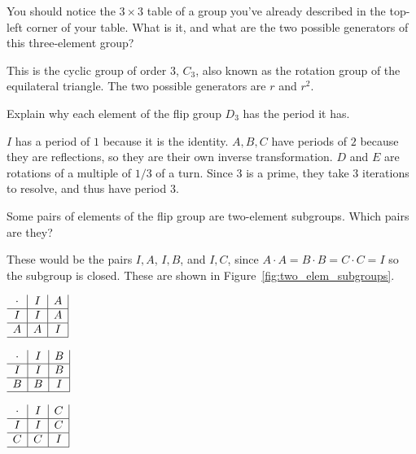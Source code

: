 \documentclass[../gatm_answers.tex]{subfiles}
\begin{document}
\begin{outer_problem}
\item You should notice the $3\times 3$ table of a group you've already described in the top-left corner of your table. What is it, and what are the two possible generators of this three-element group?
\end{outer_problem}

This is the cyclic group of order $3$, $C_3$, also known as the rotation group of the equilateral triangle. The two possible generators are $r$ and $r^2$.

\begin{outer_problem}
\item Explain why each element of the flip group $D_3$ has the period it has.
\end{outer_problem}

$I$ has a period of $1$ because it is the identity. $A,B,C$ have periods of $2$ because they are reflections, so they are their own inverse transformation. $D$ and $E$ are rotations of a multiple of $1/3$ of a turn. Since $3$ is a prime, they take $3$ iterations to resolve, and thus have period $3$.

\begin{outer_problem}
\item Some pairs of elements of the flip group are two-element subgroups. Which pairs are they?
\end{outer_problem}

These would be the pairs ${I,A}$, ${I,B}$, and ${I,C}$, since $A\cdot A=B\cdot B=C\cdot C = I$ so the subgroup is closed. These are shown in Figure~\ref{fig:two_elem_subgroups}.

\begin{center}
\begin{minipage}{0.3\textwidth}
\centering
$\begin{array}{c|c|c|}
\cdot & I & A \\ \hline
I & I & A \\ \hline
A & A & I \\ \hline
\end{array}$
\end{minipage}\hfill
\begin{minipage}{0.3\textwidth}
\centering
$\begin{array}{c|c|c|}
\cdot & I & B \\ \hline
I & I & B \\ \hline
B & B & I \\ \hline
\end{array}$
\end{minipage}\hfill
\begin{minipage}{0.3\textwidth}
\centering
$\begin{array}{c|c|c|}
\cdot & I & C \\ \hline
I & I & C \\ \hline
C & C & I \\ \hline
\end{array}$
\end{minipage}
\label{fig:two_elem_subgroups}
\end{center}
\end{document}
